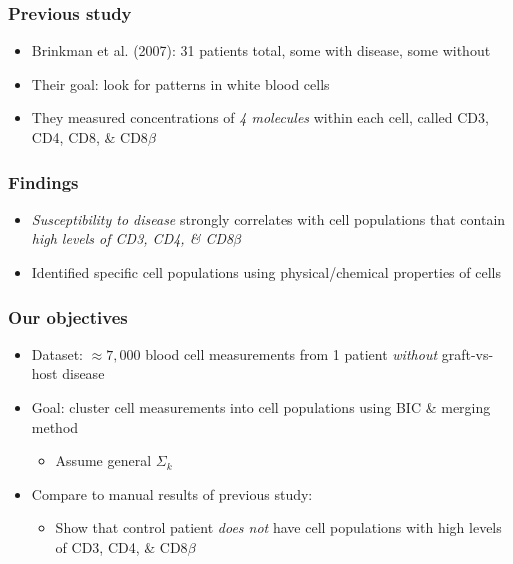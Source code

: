 \documentclass[mathserif,compress]{beamer}
\renewcommand\;{\,}
\begin{document}
\begin{frame}\frametitle{Previous study}
\begin{itemize}
\item[]
\alert{Brinkman et al. (2007):} 31 patients total, some with disease, some without
\bigskip
\item[]
\alert{Their goal:} look for patterns in white blood cells
\bigskip
\item[]
They measured concentrations of \emph{4 molecules} within each cell, called CD3, CD4, CD8, \& CD8$\beta$
\end{itemize}
\end{frame}

\begin{frame}\frametitle{Findings}
\begin{itemize}
\item
\emph{Susceptibility to disease} strongly correlates with cell populations that contain \emph{high levels of CD3, CD4, \& CD8$\beta$}
\bigskip
\item
Identified specific cell populations using physical/chemical properties of cells
\end{itemize}
\end{frame}

\begin{frame}\frametitle{Our objectives}
\begin{itemize}
\item[]
\alert{Dataset:}
 $\approx 7,000$ blood cell measurements from 1 patient \emph{without} graft-vs-host disease
\bigskip
\item[]
\alert{Goal:} cluster cell measurements into cell populations using BIC \& merging method
\bigskip
\begin{itemize}
\item
Assume general $\Sigma_k$
\end{itemize}
\bigskip
\item[]
Compare to manual results of previous study:
\bigskip
\begin{itemize}
\item
Show that control patient \emph{does not} have cell populations with high levels of CD3, CD4, \& CD8$\beta$
\end{itemize}
\end{itemize}
\end{frame}
\end{document}
